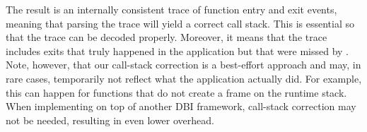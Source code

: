 The result is an internally consistent trace of function entry and exit events, meaning that parsing the trace will yield a correct call stack. This is essential so that the trace can be decoded properly. Moreover, it means that the trace includes exits that truly happened in the application but that were missed by \pin. Note, however, that our call-stack correction is a best-effort approach and may, in rare cases, temporarily not reflect what the application actually did. For example, this can happen for functions that do not create a frame on the runtime stack. When implementing \parlot on top of another DBI framework, call-stack correction may not be needed, resulting in even lower \parlot overhead.
